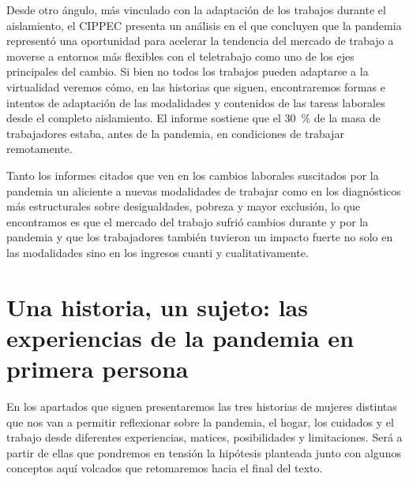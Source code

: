 \begin{refsection}
Desde otro ángulo, más vinculado con la adaptación de los trabajos durante el aislamiento, el CIPPEC \protect\parencite*{4275-CIPPEC2021} presenta un análisis en el que concluyen que la pandemia representó una oportunidad para acelerar la tendencia del mercado de trabajo a moverse a entornos más flexibles con el teletrabajo como uno de los ejes principales del cambio. Si bien no todos los trabajos pueden adaptarse a la virtualidad veremos cómo, en las historias que siguen, encontraremos formas e intentos de adaptación de las modalidades y contenidos de las tareas laborales desde el completo aislamiento. El informe sostiene que el \SI{30}{\percent} de la masa de trabajadores estaba, antes de la pandemia, en condiciones de trabajar remotamente.

Tanto los informes citados que ven en los cambios laborales suscitados por la pandemia un aliciente a nuevas modalidades de trabajar como en los diagnósticos más estructurales sobre desigualdades, pobreza y mayor exclusión, lo que encontramos es que el mercado del trabajo sufrió cambios durante y por la pandemia y que los trabajadores también tuvieron un impacto fuerte no solo en las modalidades sino en los ingresos cuanti y cualitativamente.


\section[Una historia, un sujeto: las experiencias de la pandemia en primera persona]{Una historia, un sujeto: las experiencias de la pandemia en primera persona}
\label{cap-28.una-historia-un-sujeto-las-experiencias-de-la-pandemia-en-primera-persona}
En los apartados que siguen presentaremos las tres historias de mujeres distintas que nos van a permitir reflexionar sobre la pandemia, el hogar, los cuidados y el trabajo desde diferentes experiencias, matices, posibilidades y limitaciones. Será a partir de ellas que pondremos en tensión la hipótesis planteada junto con algunos conceptos aquí volcados que retomaremos hacia el final del texto.



\end{refsection}
